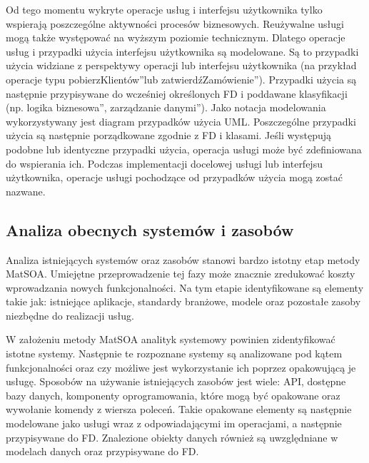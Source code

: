 Od tego momentu wykryte operacje usług i interfejsu użytkownika tylko wspierają poszczególne aktywności procesów biznesowych. Reużywalne usługi mogą także występować na wyższym poziomie technicznym. Dlatego operacje usług i przypadki użycia interfejsu użytkownika są modelowane. Są to przypadki użycia widziane z perspektywy operacji lub interfejsu użytkownika (na przykład operacje typu \quotedblbase pobierzKlientów\textquotedblright lub \quotedblbase zatwierdźZamówienie\textquotedblright). Przypadki użycia są następnie przypisywane do wcześniej określonych FD i poddawane klasyfikacji (np. \quotedblbase logika biznesowa\textquotedblright, \quotedblbase zarządzanie danymi\textquotedblright). Jako notacja modelowania wykorzystywany jest diagram przypadków użycia UML. Poszczególne przypadki użycia są następnie porządkowane zgodnie z FD i klasami. Jeśli występują podobne lub identyczne przypadki użycia, operacja usługi może być zdefiniowana do wspierania ich. Podczas implementacji docelowej usługi lub interfejsu użytkownika, operacje usługi pochodzące od przypadków użycia mogą zostać nazwane. 

\subsection*{Analiza obecnych systemów i zasobów}
Analiza istniejących systemów oraz zasobów stanowi bardzo istotny etap metody MatSOA. Umiejętne przeprowadzenie tej fazy może znacznie zredukować koszty wprowadzania nowych funkcjonalności. Na tym etapie identyfikowane są elementy takie jak: istniejące aplikacje, standardy branżowe, modele oraz pozostałe zasoby niezbędne do realizacji usług. 

W założeniu metody MatSOA analityk systemowy powinien zidentyfikować istotne systemy. Następnie te rozpoznane systemy są analizowane pod kątem funkcjonalności oraz czy możliwe jest wykorzystanie ich poprzez opakowującą je usługę. Sposobów na używanie istniejących zasobów jest wiele: API, dostępne bazy danych, komponenty oprogramowania, które mogą być opakowane oraz wywołanie komendy z wiersza poleceń.
Takie opakowane elementy są następnie modelowane jako usługi wraz z odpowiadającymi im operacjami, a następnie przypisywane do FD. Znalezione obiekty danych również są uwzględniane w modelach danych oraz przypisywane do FD.

